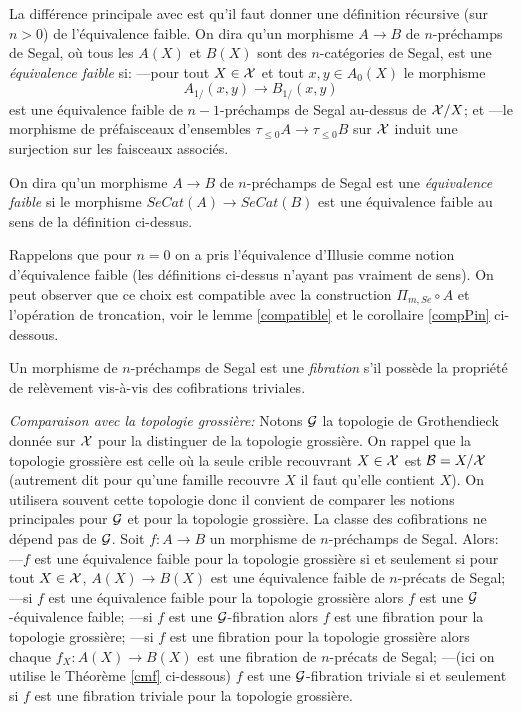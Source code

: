 \documentclass[12pt]{article}
\newcommand{\Gg}{{\cal G}}
\newcommand{\Bb}{{\cal B}}
\newcommand{\Xx}{{\cal X}}
\begin{document}
La diff\'erence principale avec \cite{Jardine}
est qu'il faut donner une d\'efinition r\'ecursive (sur $n>0$) de
l'\'equivalence
faible. On dira qu'un morphisme $A\rightarrow B$ de $n$-pr\'echamps de Segal,
o\`u tous
les $A(X)$ et $B(X)$ sont des $n$-cat\'egories de Segal, est
une {\em \'equivalence faible} si:
\newline
---pour tout $X\in \Xx$ et tout $x,y\in A_0(X)$ le morphisme
$$
A_{1/}(x,y)\rightarrow B_{1/}(x,y)
$$
est une \'equivalence faible de $n-1$-pr\'echamps de Segal au-dessus de
$\Xx /X$;
et
\newline
---le morphisme de pr\'efaisceaux d'ensembles
$\tau _{\leq 0} A\rightarrow \tau _{\leq 0}B$ sur $\Xx$
induit une surjection sur les faisceaux associ\'es.

On dira qu'un morphisme $A\rightarrow B$ de $n$-pr\'echamps de Segal est
une {\em
\'equivalence faible} si le morphisme $SeCat(A)\rightarrow SeCat(B)$ est une
\'equivalence faible au sens de la d\'efinition ci-dessus.

Rappelons que pour $n=0$ on a pris l'\'equivalence d'Illusie comme notion
d'\'equivalence
faible (les d\'efinitions ci-dessus n'ayant pas vraiment de sens).
On peut observer que ce choix est compatible avec la construction $\Pi
_{m,Se}\circ A$ et l'op\'eration de troncation, voir le lemme \ref{compatible}
et le corollaire \ref{compPin} ci-dessous.


Un morphisme de $n$-pr\'echamps de Segal est une {\em fibration} s'il poss\`ede
la  propri\'et\'e de rel\`evement vis-\`a-vis
des cofibrations triviales.


{\em Comparaison avec la topologie grossi\`ere:}
Notons $\Gg$ la topologie de Grothendieck donn\'ee sur $\Xx$ pour
la distinguer de la
topologie grossi\`ere.
On rappel que la topologie grossi\`ere est celle o\`u la seule crible
recouvrant $X\in \Xx$ est
$\Bb = X/\Xx$ (autrement dit pour qu'une famille recouvre $X$ il faut
qu'elle contient $X$).
On utilisera souvent cette topologie donc il convient de comparer les
notions principales pour
$\Gg$ et pour la topologie grossi\`ere.  La classe des cofibrations ne
d\'epend pas de
$\Gg$. Soit $f:A\rightarrow
B$ un morphisme de $n$-pr\'echamps de Segal. Alors:
\newline
---$f$ est une
\'equivalence faible pour la topologie grossi\`ere si et seulement si pour tout
$X\in \Xx$, $A(X)\rightarrow B(X)$ est une \'equivalence faible de $n$-pr\'ecats
de Segal;
\newline
---si $f$ est une \'equivalence faible pour la topologie grossi\`ere alors $f$
est une $\Gg$-\'equivalence faible;
\newline
---si $f$ est une $\Gg$-fibration alors $f$ est une fibration pour la topologie
grossi\`ere;
\newline
---si $f$ est une fibration pour la topologie grossi\`ere alors chaque $f_X:
A(X)\rightarrow B(X)$ est une fibration de $n$-pr\'ecats de Segal;
\newline
---(ici on utilise le Th\'eor\`eme \ref{cmf} ci-dessous) $f$ est une
$\Gg$-fibration
triviale si et seulement si $f$ est une fibration triviale pour la topologie
grossi\`ere.
\end{document}
